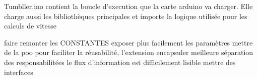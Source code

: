 Tumbller.ino
contient la boucle d'execution que la carte arduino va charger. Elle charge
aussi les bibliothèques principales et importe la logique utilisée pour
les calculs de vitesse

faire remonter les CONSTANTES
exposer plus facilement les paramètres
mettre de la poo pour faciliter la réusabilité, l'extension
encapsuler
meilleure séparation des responsabilitées
le flux d'information est difficilement lisible
mettre des interfaces